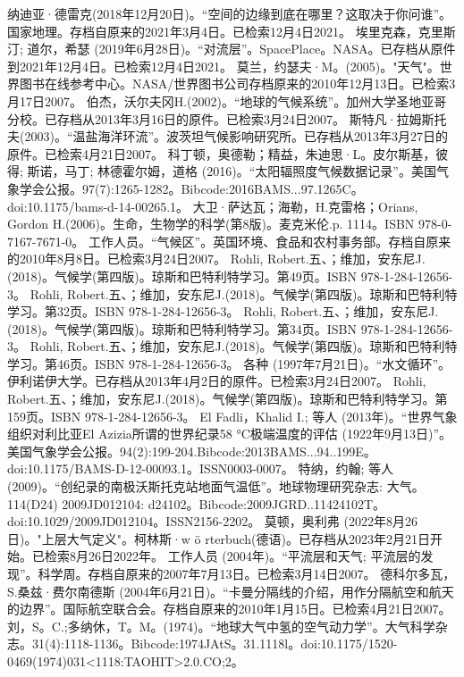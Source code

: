 \begin{enumerate}
 纳迪亚·德雷克(2018年12月20日)。“空间的边缘到底在哪里？这取决于你问谁”。国家地理。存档自原来的2021年3月4日。已检索12月4日2021。
 埃里克森，克里斯汀; 道尔，希瑟 (2019年6月28日)。“对流层”。SpacePlace。NASA。已存档从原件到2021年12月4日。已检索12月4日2021。
 莫兰，约瑟夫·M。(2005)。"天气"。世界图书在线参考中心。NASA/世界图书公司存档原来的2010年12月13日。已检索3月17日2007。
 伯杰，沃尔夫冈H.(2002)。“地球的气候系统”。加州大学圣地亚哥分校。已存档从2013年3月16日的原件。已检索3月24日2007。
 斯特凡·拉姆斯托夫(2003)。“温盐海洋环流”。波茨坦气候影响研究所。已存档从2013年3月27日的原件。已检索4月21日2007。
 科丁顿，奥德勒；精益，朱迪思·L。皮尔斯基，彼得; 斯诺，马丁; 林德霍尔姆，道格 (2016)。“太阳辐照度气候数据记录”。美国气象学会公报。97(7):1265-1282。Bibcode:2016BAMS...97.1265C。doi:10.1175/bams-d-14-00265.1。
 大卫·萨达瓦；海勒，H.克雷格；Orians, Gordon H.(2006)。生命，生物学的科学(第8版)。麦克米伦.p. 1114。ISBN 978-0-7167-7671-0。
 工作人员。“气候区”。英国环境、食品和农村事务部。存档自原来的2010年8月8日。已检索3月24日2007。
 Rohli, Robert.五、；维加，安东尼J.(2018)。气候学(第四版)。琼斯和巴特利特学习。第49页。ISBN 978-1-284-12656-3。
 Rohli, Robert.五、；维加，安东尼J.(2018)。气候学(第四版)。琼斯和巴特利特学习。第32页。ISBN 978-1-284-12656-3。
 Rohli, Robert.五、；维加，安东尼J.(2018)。气候学(第四版)。琼斯和巴特利特学习。第34页。ISBN 978-1-284-12656-3。
 Rohli, Robert.五、；维加，安东尼J.(2018)。气候学(第四版)。琼斯和巴特利特学习。第46页。ISBN 978-1-284-12656-3。
 各种 (1997年7月21日)。“水文循环”。伊利诺伊大学。已存档从2013年4月2日的原件。已检索3月24日2007。
 Rohli, Robert.五、；维加，安东尼J.(2018)。气候学(第四版)。琼斯和巴特利特学习。第159页。ISBN 978-1-284-12656-3。
 El Fadli，Khalid I.; 等人 (2013年)。“世界气象组织对利比亚El Azizia所谓的世界纪录58 °C极端温度的评估 (1922年9月13日)”。美国气象学会公报。94(2):199-204.Bibcode:2013BAMS...94..199E。doi:10.1175/BAMS-D-12-00093.1。ISSN0003-0007。 
 特纳，约翰; 等人 (2009)。“创纪录的南极沃斯托克站地面气温低”。地球物理研究杂志: 大气。114(D24) 2009JD012104: d24102。Bibcode:2009JGRD..11424102T。doi:10.1029/2009JD012104。ISSN2156-2202。 
 莫顿，奥利弗 (2022年8月26日)。"上层大气定义"。柯林斯·w ö rterbuch(德语)。已存档从2023年2月21日开始。已检索8月26日2022年。
 工作人员 (2004年)。“平流层和天气; 平流层的发现”。科学周。存档自原来的2007年7月13日。已检索3月14日2007。
 德科尔多瓦，S.桑兹·费尔南德斯 (2004年6月21日)。“卡曼分隔线的介绍，用作分隔航空和航天的边界”。国际航空联合会。存档自原来的2010年1月15日。已检索4月21日2007。
 刘，S。C.;多纳休，T。M。(1974)。“地球大气中氢的空气动力学”。大气科学杂志。31(4):1118-1136。Bibcode:1974JAtS。31.1118l。doi:10.1175/1520-0469(1974)031<1118:TAOHIT>2.0.CO;2。

\end{enumerate}
